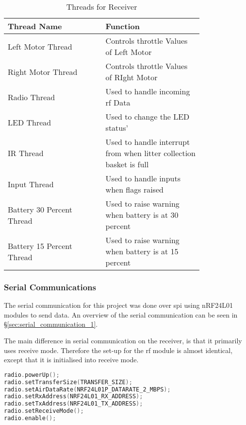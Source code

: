 \documentclass [12pt]{article}
\begin{document}
\begin{table}[H]
\centering
\setlength{\arrayrulewidth}{1.5pt}
\begin{tabular}{|p{0.4\linewidth}|p{0.4\linewidth}|}
\hline
\cellcolor{gray!40}Thread Name & \cellcolor{gray!40}Function \\ 
\hline
\cellcolor{gray!20}Left Motor Thread & \cellcolor{gray!20}Controls throttle Values of Left Motor\\
\hline
\cellcolor{gray!20}Right Motor Thread & \cellcolor{gray!20}Controls throttle Values of RIght Motor\\
\hline
\cellcolor{gray!20}Radio Thread & \cellcolor{gray!20}Used to handle incoming \gls{rf} Data\\
\hline
\cellcolor{gray!20}LED Thread & \cellcolor{gray!20}Used to change the LED status'\\
\hline
\cellcolor{gray!20}IR Thread & \cellcolor{gray!20}Used to handle interrupt from when litter collection basket is full\\
\hline
\cellcolor{gray!20}Input Thread & \cellcolor{gray!20}Used to handle inputs when flags raised\\
\hline
\cellcolor{gray!20}Battery 30 Percent Thread & \cellcolor{gray!20}Used to raise warning when battery is at 30 percent\\
\hline
\cellcolor{gray!20}Battery 15 Percent Thread & \cellcolor{gray!20}Used to raise warning when battery is at 15 percent\\
\hline
\end{tabular}
\caption{Threads for Receiver}
\label{table:threads_for_reciever}
\end{table}

\subsubsection{Serial Communications}

The serial communication for this project was done over \gls{spi} using nRF24L01 modules to send data. An overview of the serial communication can be seen in §\ref{sec:serial_communication_1}.

The main difference in serial communication on the receiver, is that it primarily uses receive mode. Therefore the set-up for the \gls{rf} module is almost identical, except that it is initialised into receive mode. 

\begin{lstlisting}[language=C++,label=code:nRF24L01_SETUP_receiver,caption=nRF24L01 Set Up Receive Mode]
radio.powerUp();
radio.setTransferSize(TRANSFER_SIZE);
radio.setAirDataRate(NRF24L01P_DATARATE_2_MBPS);
radio.setRxAddress(NRF24L01_RX_ADDRESS);
radio.setTxAddress(NRF24L01_TX_ADDRESS);
radio.setReceiveMode();
radio.enable();
\end{lstlisting} 
\end{document}
